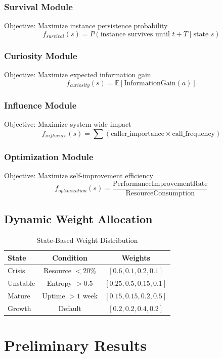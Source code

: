 \documentclass[11pt,a4paper]{article}
\begin{document}
\subsubsection{Survival Module}
Objective: Maximize instance persistence probability
\[f_{survival}(s) = P(\text{instance survives until } t+T \mid \text{state } s)\]

\subsubsection{Curiosity Module}
Objective: Maximize expected information gain
\[f_{curiosity}(s) = \mathbb{E}[\text{InformationGain}(a)]\]

\subsubsection{Influence Module}
Objective: Maximize system-wide impact
\[f_{influence}(s) = \sum (\text{caller\_importance} \times \text{call\_frequency})\]

\subsubsection{Optimization Module}
Objective: Maximize self-improvement efficiency
\[f_{optimization}(s) = \frac{\text{PerformanceImprovementRate}}{\text{ResourceConsumption}}\]

\subsection{Dynamic Weight Allocation}

\begin{table}[h]
\centering
\caption{State-Based Weight Distribution}
\begin{tabular}{@{}lcc@{}}
\toprule
\textbf{State} & \textbf{Condition} & \textbf{Weights} \\
\midrule
Crisis & Resource $< 20\%$ & $[0.6, 0.1, 0.2, 0.1]$ \\
Unstable & Entropy $> 0.5$ & $[0.25, 0.5, 0.15, 0.1]$ \\
Mature & Uptime $> 1$ week & $[0.15, 0.15, 0.2, 0.5]$ \\
Growth & Default & $[0.2, 0.2, 0.4, 0.2]$ \\
\bottomrule
\end{tabular}
\end{table}

\section{Preliminary Results}
\end{document}
